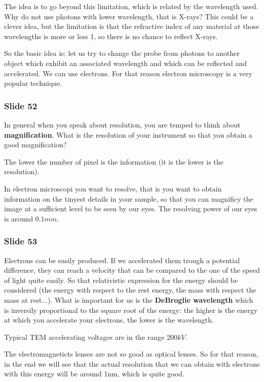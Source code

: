 \documentclass[../main/main.tex]{subfiles}
\begin{document}
The idea is to go beyond this limitation, which is related by the wavelength used. Why do not use photons with lower wavelength, that is X-rays? This could be a clever idea, but the limitation is that the refractive index of any material at those wavelengths is more or less 1, so there is no chance to reflect X-rays.

So the basic idea is: let us try to change the probe from photons to another object which exhibit an associated wavelength and which can be reflected and accelerated. We can use electrons.
For that reason electron microscopy is a very popular technique.

\subsubsection{Slide 52}
In general when you speak about resolution, you are temped to think about \textbf{magnification}. What is the resolution of your instrument so that you obtain a good magnification?

The lower the number of pixel is the information (it is the lower is the resolution).

In electron microscopi you want to resolve, that is you want to obtain information on the tinyest details in your sample, so that you can magnificy the image at a sufficient level to be seen by our eyes.
The resolving power of our eyes is around \( 0.1mm \).

\subsubsection{Slide 53}
Electrons can be easily produced. If we accelerated them trough a potential difference, they can reach a velocity that can be compared to the one of the speed of light quite easily.
So that relativistic expression for the energy should be considered (the energy with respect to the rest energy, the mass with respect the mass at rest...). What is important for us is the \textbf{DeBroglie wavelength} which is inversily proportional to the square root of the energy: the higher is the energy at which you accelerate your electrons, the lower is the wavelength.

Typical TEM accelerating voltages are in the range \( 200kV \).

The electromagneticts lenses are not so good as optical lenses. So for that reason, in the end we will see that the actual resolution that we can obtain with electrons with this energy will be around 1nm, which is quite good.
\end{document}
